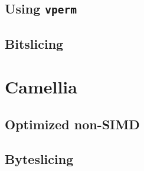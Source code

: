 


\subsection{Using \texttt{vperm}}




\subsection{Bitslicing}




\section{Camellia}

\subsection{Optimized non-SIMD}




\subsection{Byteslicing}



